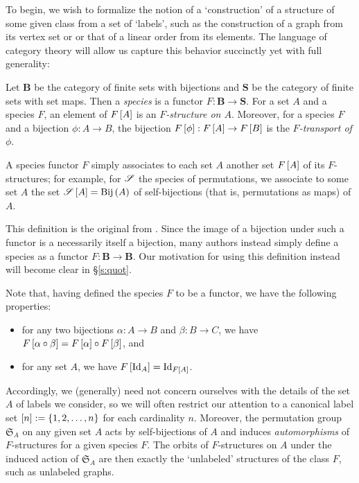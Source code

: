 \documentclass[sectionflow,singlespace,twoside,boldmathhdr]{brandiss} %
\numberwithin{section}{chapter}
\numberwithin{figure}{chapter}
\begin{document}
To begin, we wish to formalize the notion of a `construction' of a structure of some given class from a set of `labels', such as the construction of a graph from its vertex set or or that of a linear order from its elements.
The language of category theory will allow us capture this behavior succinctly yet with full generality:
\begin{definition}\label{def:species}
  Let $\mathbf{B}$ be the category of finite sets with bijections and $\mathbf{S}$ be the category of finite sets with set maps.
  Then a \emph{species} is a functor $F: \mathbf{B} \to \mathbf{S}$.
  For a set $A$ and a species $F$, an element of $F \left[ {A} \right]$ is an \emph{$F$-structure on $A$}.
  Moreover, for a species $F$ and a bijection $\phi: A \to B$, the bijection $F \left[ {\phi} \right]: F \left[ {A} \right] \to F \left[ {B} \right]$ is the \emph{$F$-transport of $\phi$}.
\end{definition}
A species functor $F$ simply associates to each set $A$ another set $F \left[ {A} \right]$ of its $F$-structures; for example, for $\mathscr{S}$ the species of permutations, we associate to some set $A$ the set $\mathscr{S} \left[ {A} \right] = \operatorname{Bij} \left( {A} \right)$ of self-bijections (that is, permutations as maps) of $A$.

This definition is the original from \cite{joy:species}.
Since the image of a bijection under such a functor is a necessarily itself a bijection, many authors instead simply define a species as a functor $F: \mathbf{B} \to \mathbf{B}$.
Our motivation for using this definition instead will become clear in \S \ref{s:quot}.

Note that, having defined the species $F$ to be a functor, we have the following properties:
\begin{itemize}
\item for any two bijections $\alpha: A \to B$ and $\beta: B \to C$, we have $F \left[ {\alpha \circ \beta} \right] = F \left[ {\alpha} \right] \circ F \left[ {\beta} \right]$, and
\item for any set $A$, we have $F \left[ {\operatorname{Id}_{A}} \right] = \operatorname{Id}_{F \left[ {A} \right]}$.
\end{itemize}
Accordingly, we (generally) need not concern ourselves with the details of the set $A$ of labels we consider, so we will often restrict our attention to a canonical label set $\left[ {n} \right] := \left\{ {1, 2, \dots, n} \right\}$ for each cardinality $n$.
Moreover, the permutation group $\mathfrak{S}_{A}$ on any given set $A$ acts by self-bijections of $A$ and induces \emph{automorphisms} of $F$-structures for a given species $F$.
The orbits of $F$-structures on $A$ under the induced action of $\mathfrak{S}_{A}$ are then exactly the `unlabeled' structures of the class $F$, such as unlabeled graphs.
\end{document}
